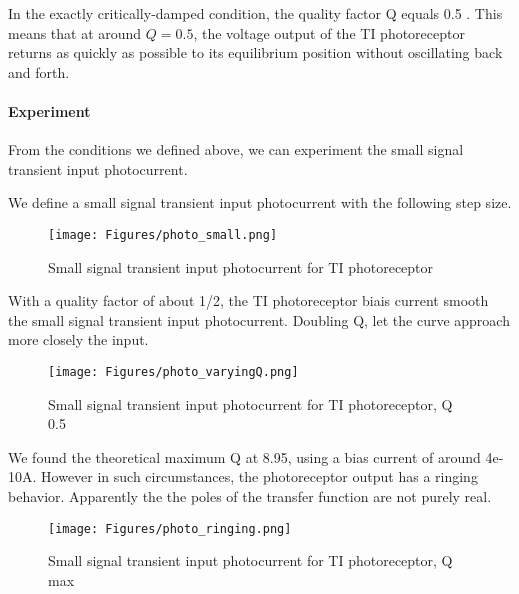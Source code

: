 In the exactly critically-damped condition, the quality factor Q equals 0.5 . This means that at around $Q=0.5$, the voltage output of the TI photoreceptor returns as quickly as possible to its equilibrium position without oscillating back and forth.

\paragraph{Experiment}

From the conditions we defined above, we can experiment the small signal transient input photocurrent. 

We define a small signal transient input photocurrent with the following step size. 

\begin{figure}[H]
    \centering
    \texttt{[image: Figures/photo\_small.png]}
    \caption{Small signal transient input photocurrent for TI photoreceptor}
    \label{fig:basalandcerebellum}
\end{figure}

With a quality factor of about 1/2, the TI photoreceptor biais current smooth the small signal transient input photocurrent. Doubling Q, let the curve approach more closely the input.

\begin{figure}[H]
    \centering
    \texttt{[image: Figures/photo\_varyingQ.png]}
    \caption{Small signal transient input photocurrent for TI photoreceptor, Q ~ 0.5}
    \label{fig:basalandcerebellum}
\end{figure}

We found the theoretical maximum Q at 8.95, using a bias current of around 4e-10A. However in such circumstances, the photoreceptor output has a ringing behavior. Apparently the the poles of the transfer function are not purely real.

\begin{figure}[H]
    \centering
    \texttt{[image: Figures/photo\_ringing.png]}
    \caption{Small signal transient input photocurrent for TI photoreceptor, Q max}
    \label{fig:basalandcerebellum}
\end{figure}

